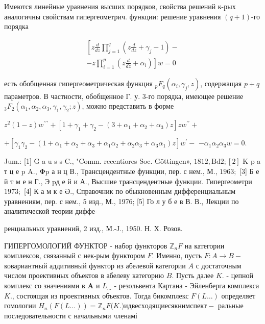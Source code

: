 \documentclass[10pt]{article}
\begin{document}
Имеются линейные уравнения высших порядков, свойства решений к-рых аналогичны свойствам гипергеометрич. функции: решение уравнения $(q+1)$-го порядка



\[

\begin{gathered}

{\left[z \frac{d}{d z} \prod_{j=1}^{q}\left(z \frac{d}{d z}+\gamma_{j}-1\right)-\right.} \\

\left.-z \prod_{i=1}^{p}\left(z \frac{d}{d z}+\alpha_{i}\right)\right] w=0

\end{gathered}

\]



есть обобщенная гипергеометрическая функция ${ }_{p} F_{q}\left(\alpha_{i}, \gamma_{j}, z\right)$, содержащая $p+q$ параметров. В частности, обобщенное Г. у. 3-го порядка, имеющее решение ${ }_{3} F_{2}\left(\alpha_{1}, \alpha_{2}, \alpha_{3}, \gamma_{1}, \gamma_{2} ; z\right)$, можно представить в форме



$z^{2}(1-z) w^{\prime \prime \prime}+\left[1+\gamma_{1}+\gamma_{2}-\left(3+\alpha_{1}+\alpha_{2}+\alpha_{3}\right) z\right] z w^{\prime \prime}+$



$+\left[\gamma_{1} \gamma_{2}-\left(1+\alpha_{1}+\alpha_{2}+\alpha_{3}+\alpha_{1} \alpha_{2}+\alpha_{2} \alpha_{3}+\alpha_{3} \alpha_{1}\right) z\right] w^{\prime}-$ $-\alpha_{1} \alpha_{2} \alpha_{3} w=0$.



Jum.: [1] G a u s s C., "Comm. recentiores Soc. Göttingen», $1812, \mathrm{Bd} 2 ;[2]$ K p a т ц е $\mathrm{p}$ A., $\mathbf{\Phi} \mathrm{p}$ а н ц В., Трансцендентные функции, пер. с нем., М., $1963 ;$ [3] Б е й т м е н Г., Э pд е й и А., Высшие трансцендентные функции. Гипергеометри$1973 ;$ [4] К а м к е Ә., Справочник по обыкновенным дифференциальным уравнениям, пер. с нем., 5 изд., М., 1976; [5] Го л у б е в В. В., ЈІекции по аналитической теории диффе-

ренциальных уравнений, 2 изд., М.-Ј., 1950. Н. Х. Розов.



ГИПЕРГОМОЛОГИЙ ФУНКТОР - набор функторов $\mathbb{Z}_{n} F$ на категории комплексов, связанный с нек-рым функтором $F$. Именно, пусть $F: A \rightarrow B-$ ковариантный аддитивный функтор из абелевой категории $A$ с достаточным числом проективных объектов в абелеву категорию $B$. Пусть далее $K$. - цепной комплекс со значениями в $\boldsymbol{A}$ и $L_{\ldots}$ - резольвента Картана - Эйленберга комплекса $K$., состоящая из проективных объектов. Тогда бикомплекс $F(L \ldots)$ определяет гомологии $H_{n}(F(L \ldots))=\mathbb{Z}_{n} F(K$.$) и две сходящиеся к ним спект-$ ральные последовательности с начальными членамі
\end{document}
